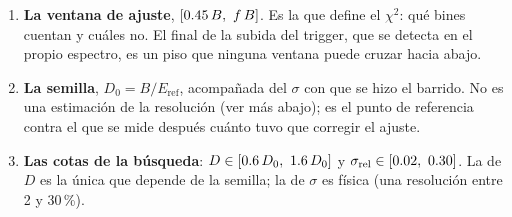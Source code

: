 \documentclass[11pt,a4paper]{article}
\begin{document}
\begin{enumerate}
\item \textbf{La ventana de ajuste}, $[0.45\,B,\ f\,B]$. Es la que define
      el $\chi^2$: qué bines cuentan y cuáles no. El final de la subida del
      trigger, que se detecta en el propio espectro, es un piso que ninguna
      ventana puede cruzar hacia abajo.
\item \textbf{La semilla}, $D_0 = B/E_{\text{ref}}$, acompañada del $\sigma$
      con que se hizo el barrido. No es una estimación de la resolución (ver
      más abajo); es el punto de referencia contra el que se mide después
      cuánto tuvo que corregir el ajuste.
\item \textbf{Las cotas de la búsqueda}: $D \in [0.6\,D_0,\ 1.6\,D_0]$
      y $\sigma_{\text{rel}} \in [\CotaSigmaMin,\ \CotaSigmaMax]$. La de $D$ es
      la única que depende de la semilla; la de $\sigma$ es física (una
      resolución entre 2 y 30\,\%).
\end{enumerate}
\end{document}
